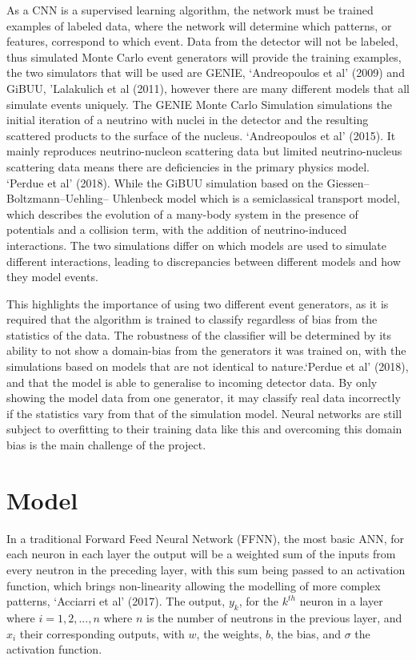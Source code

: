 \documentclass[11pt]{article}
\begin{document}
As a CNN is a supervised learning algorithm, the network must be trained examples of labeled data, where the network will determine which patterns, or features, correspond to which event. Data from the detector will not be labeled, thus simulated Monte Carlo event generators will provide the training examples, the two simulators that will be used are GENIE, ‘Andreopoulos et al’ (2009) and GiBUU, 'Lalakulich et al (2011), however there are many different models that all simulate events uniquely. The GENIE Monte Carlo Simulation simulations the initial iteration of a neutrino with nuclei in the detector and the resulting scattered products to the surface of the nucleus. ‘Andreopoulos et al’ (2015). It mainly reproduces neutrino-nucleon scattering data but limited neutrino-nucleus scattering data means there are deficiencies in the primary physics model. ‘Perdue et al’ (2018). While the GiBUU simulation based on the Giessen–Boltzmann–Uehling– Uhlenbeck model which is a semiclassical transport model, which describes the evolution of a many-body system in the presence of potentials and a collision term, with the addition  of neutrino-induced interactions. The two simulations differ on which models are used to simulate different interactions, leading to discrepancies between different models and how they model events.

This highlights the importance of using two different event generators, as it is required that the algorithm is trained to classify regardless of bias from the statistics of the data. The robustness of the classifier will be determined by its ability to not show a domain-bias from the generators it was trained on, with the simulations based on models that are not identical to nature.‘Perdue et al’ (2018), and that the model is able to generalise to incoming detector data. By only showing the model data from one generator, it may classify real data incorrectly if the statistics vary from that of the simulation model. Neural networks are still subject to overfitting to their training data like this and overcoming this domain bias is the main challenge of the project.

\section*{Model}

In a traditional Forward Feed Neural Network (FFNN), the most basic ANN, for each neuron in each layer the output will be a weighted sum of the inputs from every neutron in the preceding layer, with this sum being passed to an activation function, which brings non-linearity allowing the modelling of more complex patterns, ‘Acciarri et al’ (2017). The output, $y_k$, for the $k^{th}$ neuron in a layer where $i = 1, 2,..., n$ where $n$ is the number of neutrons in the previous layer, and $x_{i}$ their corresponding outputs, with $w$, the weights, $b$, the bias, and $\sigma$ the activation function.
\end{document}

